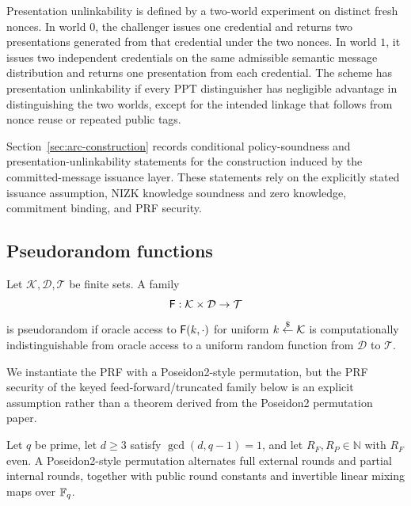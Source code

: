 \begin{definition}\label{def:pres-unlink}
Presentation unlinkability is defined by a two-world experiment on distinct fresh nonces.  In world \(0\), the
challenger issues one credential and returns two presentations generated from that credential under the two nonces.
In world \(1\), it issues two independent credentials on the same admissible semantic message distribution and returns
one presentation from each credential.  The scheme has presentation unlinkability if every PPT distinguisher has
negligible advantage in distinguishing the two worlds, except for the intended linkage that follows from nonce reuse
or repeated public tags.
\end{definition}

\begin{remark}\label{rem:arc-scope}
Section~\ref{sec:arc-construction} records conditional policy-soundness and presentation-unlinkability statements
for the construction induced by the committed-message issuance layer.  These statements rely on the explicitly
stated issuance assumption, NIZK knowledge soundness and zero knowledge, commitment binding, and PRF security.
\end{remark}

\subsection{Pseudorandom functions}
\label{subsec:prelim-prf}
\label{subsec:prf}

\begin{definition}\label{def:prf}
Let \(\mathcal K,\mathcal D,\mathcal T\) be finite sets.  A family
\[
  \mathsf{F}:\mathcal K\times \mathcal D\to \mathcal T
\]
is pseudorandom if oracle access to \(\mathsf{F}(k,\cdot)\) for uniform \(k\overset{\$}{\leftarrow}\mathcal K\) is computationally
indistinguishable from oracle access to a uniform random function from \(\mathcal D\) to \(\mathcal T\).
\end{definition}

We instantiate the PRF with a Poseidon2-style permutation, but the PRF security of the keyed
feed-forward/truncated family below is an explicit assumption rather than a theorem derived from the Poseidon2
permutation paper.

\begin{definition}\label{def:poseidon-perm}
Let \(q\) be prime, let \(d\ge 3\) satisfy \(\gcd(d,q-1)=1\), and let \(R_F,R_P\in\mathbb N\) with \(R_F\) even.
A Poseidon2-style permutation alternates full external rounds and partial internal rounds, together with public
round constants and invertible linear mixing maps over \(\mathbb{F}_q\).
\end{definition}

